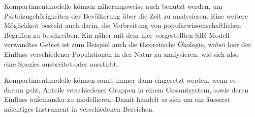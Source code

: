 \begin{refsection}
Kompartimentmodelle können näherungsweise auch benutzt werden, um Parteizugehörigkeiten der Bevölkerung über die Zeit zu analysieren. 
Eine weitere Möglichkeit besteht auch darin, die Verbreitung von populärwissenschaftlichen Begriffen zu beschreiben. 
Ein näher mit dem hier vorgestellten SIR-Modell verwandtes Gebiet ist zum Beispiel auch die theoretische Ökologie, wobei hier der Einfluss verschiedener Populationen in der Natur zu analysieren, wie sich also eine Spezies ausbreitet oder ausstirbt.

Kompartimentmodelle können somit immer dann eingesetzt werden, wenn es darum geht, Anteile verschiedener Gruppen in einem Gesamtsystem, sowie deren Einfluss aufeinander zu modellieren. 
Damit handelt es sich um ein äusserst mächtiges Instrument in verschiedenen Bereichen. 


\printbibliography[heading=subbibliography]
\end{refsection}


